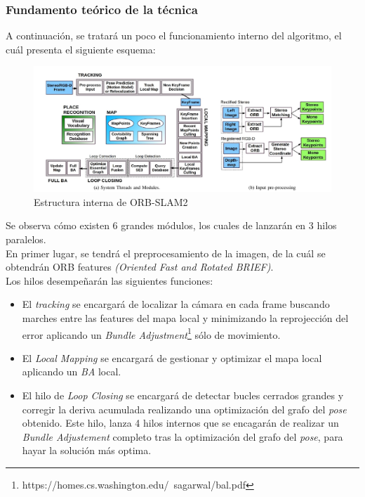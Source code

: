 \subsubsection{Fundamento teórico de la técnica}
A continuación, se tratará un poco el funcionamiento interno del algoritmo, el cuál presenta el siguiente esquema:
\begin{figure}[h!]
    \centering
    \includegraphics[width=1\textwidth]{images/orb_scheme}
    \caption{Estructura interna de ORB-SLAM2}
\end{figure}

Se observa cómo existen 6 grandes módulos, los cuales de lanzarán en 3 hilos paralelos. \\
En primer lugar, se tendrá el preprocesamiento de la imagen, de la cuál se obtendrán  ORB features 
\textit{(Oriented Fast and Rotated BRIEF)}. \\
Los hilos desempeñarán las siguientes funciones:
\begin{itemize}
    \item El \textit{tracking} se encargará de localizar la cámara en cada frame buscando marches entre las features
    del mapa local y minimizando la reprojección del error aplicando un \textit{Bundle Adjustment}\footnote{https://homes.cs.washington.edu/~sagarwal/bal.pdf} sólo de 
    movimiento.
    \item El \textit{Local Mapping} se encargará de gestionar y optimizar el mapa local aplicando un \textit{BA} local.
    \item El hilo de \textit{Loop Closing} se encargará de detectar bucles cerrados grandes y corregir la deriva acumulada
    realizando una optimización del grafo del \textit{pose} obtenido. Este hilo, lanza 4 hilos internos que se encagarán de
    realizar un \textit{Bundle Adjustement} completo tras la optimización del grafo del \textit{pose}, para hayar la solución
    más optima.
\end{itemize}

